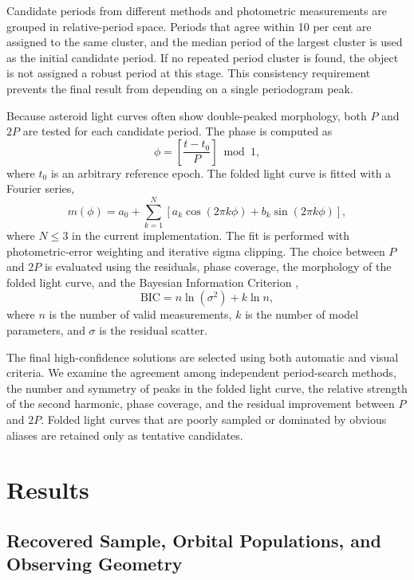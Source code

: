 \documentclass[referee]{raa}
\begin{document}
Candidate periods from different methods and photometric measurements are grouped in relative-period space. Periods that agree within 10 per cent are assigned to the same cluster, and the median period of the largest cluster is used as the initial candidate period. If no repeated period cluster is found, the object is not assigned a robust period at this stage. This consistency requirement prevents the final result from depending on a single periodogram peak.

Because asteroid light curves often show double-peaked morphology, both \(P\) and \(2P\) are tested for each candidate period. The phase is computed as
\begin{equation}
\phi=\left[\frac{t-t_0}{P}\right]\bmod 1 ,
\end{equation}
where \(t_0\) is an arbitrary reference epoch. The folded light curve is fitted with a Fourier series,
\begin{equation}
m(\phi)=a_0+\sum_{k=1}^{N}
\left[a_k\cos(2\pi k\phi)+b_k\sin(2\pi k\phi)\right],
\end{equation}
where \(N\leq3\) in the current implementation. The fit is performed with photometric-error weighting and iterative sigma clipping. The choice between \(P\) and \(2P\) is evaluated using the residuals, phase coverage, the morphology of the folded light curve, and the Bayesian Information Criterion \citep{Schwarz1978},
\begin{equation}
\mathrm{BIC}=n\ln(\sigma^2)+k\ln n ,
\end{equation}
where \(n\) is the number of valid measurements, \(k\) is the number of model parameters, and \(\sigma\) is the residual scatter.

The final high-confidence solutions are selected using both automatic and visual criteria. We examine the agreement among independent period-search methods, the number and symmetry of peaks in the folded light curve, the relative strength of the second harmonic, phase coverage, and the residual improvement between \(P\) and \(2P\). Folded light curves that are poorly sampled or dominated by obvious aliases are retained only as tentative candidates.

\section{Results}
\label{sec:results}

\subsection{Recovered Sample, Orbital Populations, and Observing Geometry}
\end{document}
